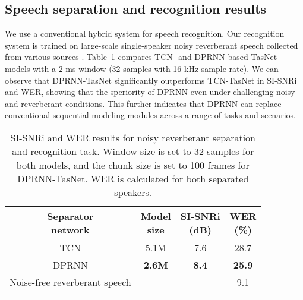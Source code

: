 \documentclass{article}
\def\thline{\noalign{\hrule height 1.0pt}}
\begin{document}
\subsection{Speech separation and recognition results}

We use a conventional hybrid system for speech recognition. Our recognition system is trained on large-scale single-speaker noisy reverberant speech collected from various sources \cite{YoshiokaEtAl:ms-tr2019}. Table~\ref{tab:asr} compares TCN- and DPRNN-based TasNet models with a 2-ms window (32 samples with 16 kHz sample rate). We can observe that DPRNN-TasNet significantly outperforms TCN-TasNet in SI-SNRi and WER, showing that the speriority of DPRNN even under challenging noisy and reverberant conditions. This further indicates that DPRNN can replace conventional sequential modeling modules across a range of tasks and scenarios.


\begin{table}[!htbp]
	\small
	\centering
	\caption{SI-SNRi and WER results for noisy reverberant separation and recognition task. Window size is set to 32 samples for both models, and the chunk size is set to 100 frames for DPRNN-TasNet. WER is calculated for both separated speakers.}
	\label{tab:asr}
	\begin{tabular}{c|c|c|c}
		\thline
		\thead{Separator\\ network} & \thead{Model \\ size} & \thead{SI-SNRi \\ (dB)} & \thead{WER \\ (\%)} \\
		\hline
        TCN & 5.1M & 7.6 & 28.7 \\
        DPRNN & \bf{2.6M} & \bf{8.4} & \bf{25.9} \\ \hline
		Noise-free reverberant speech & -- & -- & 9.1 \\
		\thline
	\end{tabular}
\end{table}



 
\end{document}
